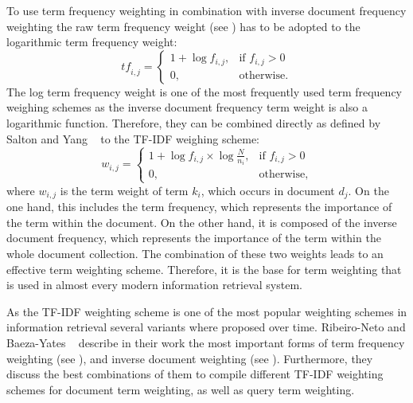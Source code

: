 To use term frequency weighting in combination with inverse document frequency weighting the raw term frequency weight (see ) has to be adopted to the logarithmic term frequency weight:
\begin{equation}
  \mathit{tf}_{i, j} =
  \begin{cases}
    1 + \log f_{i, j}, & \text{if $f_{i,j} > 0$} \\
    0, & \text{otherwise}.
  \end{cases}
\end{equation}
The log term frequency weight is one of the most frequently used term frequency weighing schemes as the inverse document frequency term weight is also a logarithmic function. Therefore, they can be combined directly as defined by Salton and Yang ~\cite{FT023} to the TF-IDF weighing scheme:
\begin{equation}
  w_{i, j} =
  \begin{cases}
    1 + \log f_{i, j} \times \log \frac{N}{n_i}, & \text{if $f_{i,j} > 0$} \\
    0, & \text{otherwise},
  \end{cases}
\end{equation}
where $w_{i, j}$ is the term weight of term $k_i$, which occurs in document $d_j$. On the one hand, this includes the term frequency, which represents the importance of the term within the document. On the other hand, it is composed of the inverse document frequency, which represents the importance of the term within the whole document collection. The combination of these two weights leads to an effective term weighting scheme. Therefore, it is the base for term weighting that is used in almost every modern information retrieval system.

As the TF-IDF weighting scheme is one of the most popular weighting schemes in information retrieval several variants where proposed over time. Ribeiro-Neto and Baeza-Yates ~\cite{ModernInvormationRetrieval1999} describe in their work the most important forms of term frequency weighting (see ), and inverse document weighting (see ). Furthermore, they discuss the best combinations of them to compile different TF-IDF weighting schemes for document term weighting, as well as query term weighting. 

